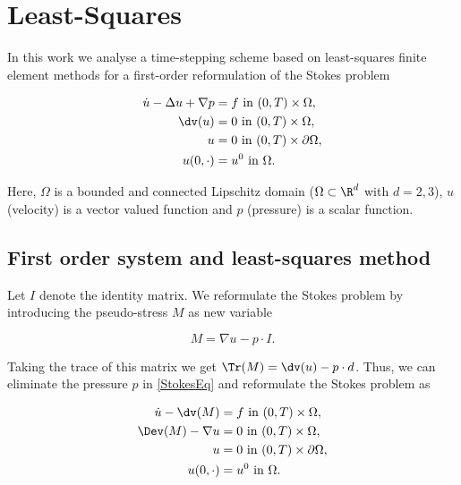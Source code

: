 \chapter{Least-Squares}
\label{C1}

In this work we analyse a time-stepping scheme based on least-squares finite element methods for a first-order reformulation of the Stokes problem

\begin{subequations}\label{StokesEq}
\begin{align}
    \dot{u}-\Delta u +\nabla p &=f \text{ in }(0,T)\times\Omega,\\
    \dv(u)&=0\text{ in }(0,T)\times\Omega,\\
    u&=0 \text{ in }(0,T)\times\partial\Omega,\\
    u(0,\cdot)&=u^0 \text{ in }\Omega.
\end{align}
\end{subequations}

Here, $\Omega$ is a bounded and connected Lipschitz domain ($\Omega\subset\R^d$ with $d=2,3$), $u$ (velocity) is a vector valued function and $p$ (pressure) is a scalar function.

\vspace{0.3 cm}

\section{First order system and least-squares method}

Let $I$ denote the identity matrix. We reformulate the Stokes problem by introducing the pseudo-stress $M$ as new variable

$$M=\nabla u-p\cdot I.$$

Taking the trace of this matrix we get $\Tr(M)=\dv(u)-p\cdot d$. Thus, we can eliminate the pressure $p$ in \eqref{StokesEq} and reformulate the Stokes problem as

\begin{subequations}\label{NewVariable}
\begin{align}
    \dot{u}-\dv(M)&=f\text{ in }(0,T)\times\Omega,\\
    \Dev(M)-\nabla u&=0\text{ in }(0,T)\times\Omega,\\
    u &= 0 \text{ in }(0,T)\times\partial\Omega,\\
    u(0,\cdot) &=u^0 \text{ in }\Omega.
\end{align}
\end{subequations}

